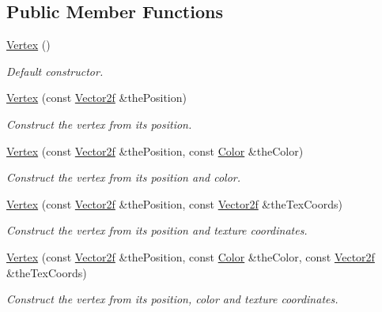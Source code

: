\subsection*{Public Member Functions}
\begin{DoxyCompactItemize}
\item 
\hyperlink{classsf_1_1_vertex_a6b4c79cd69f7ec1296fede536f39e9c8}{Vertex} ()
\begin{DoxyCompactList}\small\item\em Default constructor. \end{DoxyCompactList}\item 
\hyperlink{classsf_1_1_vertex_a4dccc5c351b73b6fac169fe442535b40}{Vertex} (const \hyperlink{namespacesf_acf03098c2577b869e2fa6836cc48f1a0}{Vector2f} \&the\-Position)
\begin{DoxyCompactList}\small\item\em Construct the vertex from its position. \end{DoxyCompactList}\item 
\hyperlink{classsf_1_1_vertex_a70b0679b4ec531d5bd1a7d0225c7321a}{Vertex} (const \hyperlink{namespacesf_acf03098c2577b869e2fa6836cc48f1a0}{Vector2f} \&the\-Position, const \hyperlink{classsf_1_1_color}{Color} \&the\-Color)
\begin{DoxyCompactList}\small\item\em Construct the vertex from its position and color. \end{DoxyCompactList}\item 
\hyperlink{classsf_1_1_vertex_ab9bf849c4c0d82d09bf5bece23d2456a}{Vertex} (const \hyperlink{namespacesf_acf03098c2577b869e2fa6836cc48f1a0}{Vector2f} \&the\-Position, const \hyperlink{namespacesf_acf03098c2577b869e2fa6836cc48f1a0}{Vector2f} \&the\-Tex\-Coords)
\begin{DoxyCompactList}\small\item\em Construct the vertex from its position and texture coordinates. \end{DoxyCompactList}\item 
\hyperlink{classsf_1_1_vertex_ad5943f2b3cbc64b6e714bb37ccaf4960}{Vertex} (const \hyperlink{namespacesf_acf03098c2577b869e2fa6836cc48f1a0}{Vector2f} \&the\-Position, const \hyperlink{classsf_1_1_color}{Color} \&the\-Color, const \hyperlink{namespacesf_acf03098c2577b869e2fa6836cc48f1a0}{Vector2f} \&the\-Tex\-Coords)
\begin{DoxyCompactList}\small\item\em Construct the vertex from its position, color and texture coordinates. \end{DoxyCompactList}\end{DoxyCompactItemize}
